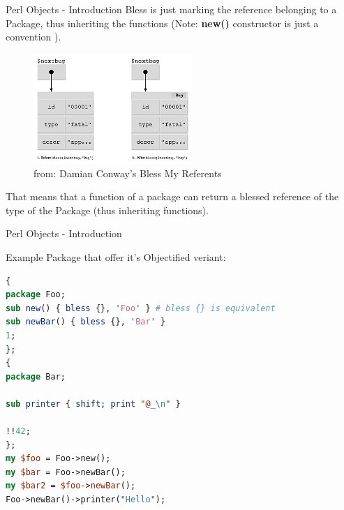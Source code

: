 \documentclass[10pt]{beamer}
\begin{document}
\begin{frame}[fragile]{Perl Objects - Introduction}
Bless is just marking the reference belonging to a Package, thus inheriting the functions (Note: \textbf{new()} constructor  is just a convention ).
\begin{figure}
    \centering
    \includegraphics[width=6cm]{images/blessing.png}
    \caption{from: Damian Conway's Bless My Referents}
    \label{fig:bless}
\end{figure}

That means that a function of a package can return a blessed reference of the type of the Package (thus inheriting functions).
\end{frame}
\begin{frame}[fragile]{Perl Objects - Introduction}

Example Package that offer it's Objectified veriant:
\begin{lstlisting}[language=perl]
{
package Foo;
sub new() { bless {}, 'Foo' } # bless {} is equivalent
sub newBar() { bless {}, 'Bar' }
1;
};
{
package Bar;

sub printer { shift; print "@_\n" }

!!42;
};
my $foo = Foo->new();
my $bar = Foo->newBar();
my $bar2 = $foo->newBar();
Foo->newBar()->printer("Hello");
\end{lstlisting}

\end{frame}

 
\end{document}
